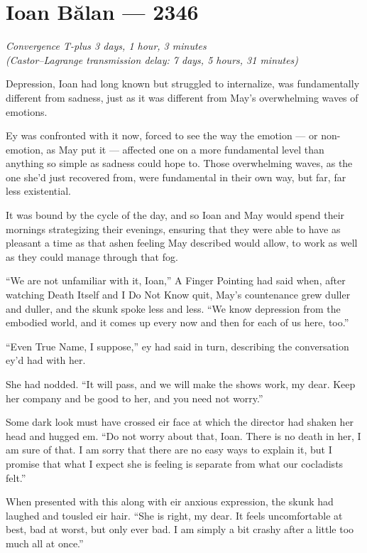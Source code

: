 \hypertarget{ioan-bux103lan-2346}{%
\chapter{Ioan Bălan — 2346}\label{ioan-bux103lan-2346}}

\begin{center}
\emph{Convergence T-plus 3 days, 1 hour, 3 minutes}\\
\emph{(Castor--Lagrange transmission delay: 7 days, 5 hours, 31 minutes)}
\end{center}

\noindent Depression, Ioan had long known but struggled to internalize, was fundamentally different from sadness, just as it was different from May's overwhelming waves of emotions.

Ey was confronted with it now, forced to see the way the emotion — or non-emotion, as May put it — affected one on a more fundamental level than anything so simple as sadness could hope to. Those overwhelming waves, as the one she'd just recovered from, were fundamental in their own way, but far, far less existential.

It was bound by the cycle of the day, and so Ioan and May would spend their mornings strategizing their evenings, ensuring that they were able to have as pleasant a time as that ashen feeling May described would allow, to work as well as they could manage through that fog.

``We are not unfamiliar with it, Ioan,'' A Finger Pointing had said when, after watching Death Itself and I Do Not Know quit, May's countenance grew duller and duller, and the skunk spoke less and less. ``We know depression from the embodied world, and it comes up every now and then for each of us here, too.''

``Even True Name, I suppose,'' ey had said in turn, describing the conversation ey'd had with her.

She had nodded. ``It will pass, and we will make the shows work, my dear. Keep her company and be good to her, and you need not worry.''

Some dark look must have crossed eir face at which the director had shaken her head and hugged em. ``Do not worry about that, Ioan. There is no death in her, I am sure of that. I am sorry that there are no easy ways to explain it, but I promise that what I expect she is feeling is separate from what our cocladists felt.''

When presented with this along with eir anxious expression, the skunk had laughed and tousled eir hair. ``She is right, my dear. It feels uncomfortable at best, bad at worst, but only ever bad. I am simply a bit crashy after a little too much all at once.''

